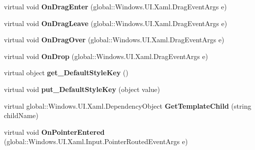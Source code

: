\begin{DoxyCompactItemize}
virtual void {\bfseries On\+Drag\+Enter} (global\+::\+Windows.\+U\+I.\+Xaml.\+Drag\+Event\+Args e)
\item 
\mbox{\label{class_windows_1_1_u_i_1_1_xaml_1_1_controls_1_1_control_a1812d64c2440d2cd9f93660273ef5896}} 
virtual void {\bfseries On\+Drag\+Leave} (global\+::\+Windows.\+U\+I.\+Xaml.\+Drag\+Event\+Args e)
\item 
\mbox{\label{class_windows_1_1_u_i_1_1_xaml_1_1_controls_1_1_control_a5c8a657f99279b16e32bf35998d46838}} 
virtual void {\bfseries On\+Drag\+Over} (global\+::\+Windows.\+U\+I.\+Xaml.\+Drag\+Event\+Args e)
\item 
\mbox{\label{class_windows_1_1_u_i_1_1_xaml_1_1_controls_1_1_control_ade79c678fe0c5aa32e43c4772d34e61e}} 
virtual void {\bfseries On\+Drop} (global\+::\+Windows.\+U\+I.\+Xaml.\+Drag\+Event\+Args e)
\item 
\mbox{\label{class_windows_1_1_u_i_1_1_xaml_1_1_controls_1_1_control_a0f6b7d0a6e0dbad0ff65dd5861c20050}} 
virtual object {\bfseries get\+\_\+\+Default\+Style\+Key} ()
\item 
\mbox{\label{class_windows_1_1_u_i_1_1_xaml_1_1_controls_1_1_control_a6cc396f98c5876ae256d5b6d1c78ded9}} 
virtual void {\bfseries put\+\_\+\+Default\+Style\+Key} (object value)
\item 
\mbox{\label{class_windows_1_1_u_i_1_1_xaml_1_1_controls_1_1_control_ac603c14d7442a0aa06e00197591e9394}} 
virtual global\+::\+Windows.\+U\+I.\+Xaml.\+Dependency\+Object {\bfseries Get\+Template\+Child} (string child\+Name)
\item 
\mbox{\label{class_windows_1_1_u_i_1_1_xaml_1_1_controls_1_1_control_ae3e99583865513e0de94e3c419b26924}} 
virtual void {\bfseries On\+Pointer\+Entered} (global\+::\+Windows.\+U\+I.\+Xaml.\+Input.\+Pointer\+Routed\+Event\+Args e)
\item 
\mbox{\label{class_windows_1_1_u_i_1_1_xaml_1_1_controls_1_1_control_a72d13df130e7f9b6c8cc7fbbf022be49}} 

\end{DoxyCompactItemize}
